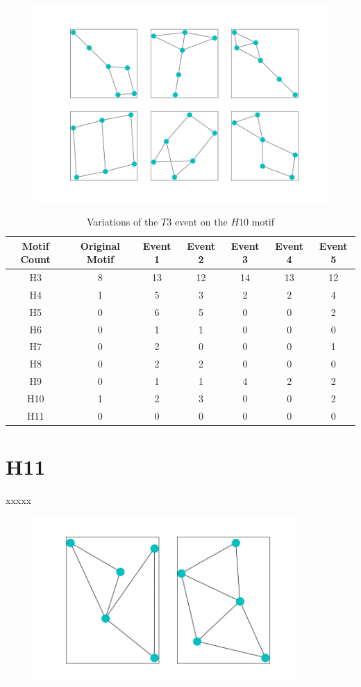 \begin{figure}
    \includegraphics[width=15cm]{Images/H10_T3_evolution.png}
\end{figure}
\begin{table}
    \centering
    \begin{tabular}{||c c c c c c c||} 
    \hline
    Motif Count & Original Motif & Event 1 & Event 2 & Event 3 & Event 4 & Event 5 \\ [0.5ex] 
    \hline\hline
    H3 & 8 & 13 & 12 & 14 & 13 & 12\\ 
    \hline
    H4 & 1 & 5 & 3 & 2 & 2 & 4\\
    \hline
    H5 & 0 & 6 & 5 & 0 & 0 & 2\\
    \hline
    H6 & 0 & 1 & 1 & 0 & 0 & 0\\
    \hline
    H7 & 0 & 2 & 0 & 0 & 0 & 1 \\
    \hline
    H8 & 0 & 2 & 2 & 0 & 0 & 0\\
    \hline
    H9 & 0 & 1 & 1 & 4 & 2 & 2\\
    \hline
    H10 & 1 & 2 & 3 & 0 & 0 & 2\\
    \hline
    H11 & 0 & 0 & 0 & 0 & 0 & 0\\
    \hline
   \end{tabular}
   \caption{Variations of the $T3$ event on the $H10$ motif}
   \label{table:19}
\end{table}

\section{H11}
xxxxx

\begin{figure}
    \includegraphics[width=10cm]{Images/H11_T3_evolution.png}
    \centering
\end{figure}

